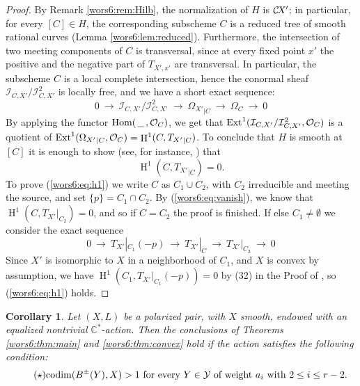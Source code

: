 \documentclass[10pt,a4paper]{article}
\numberwithin{equation}{section}
\newtheorem{corollary}[theorem]{Corollary}
\theoremstyle{definition}
\theoremstyle{remark}
\DeclareMathOperator{\HH}{H}
\def\C{{\mathbb C}}
\def\cI{{\mathcal I}}
\def\cO{{\mathcal{O}}}
\def\cY{{\mathcal Y}}
\def\operatorname#1{\mathop{\rm #1}\nolimits}
\def\Ext{\operatorname{Ext}}
\def\Hom{\operatorname{Hom}}
\def\Hom{\operatorname{Hom}}
\def\codim{\operatorname{codim}}
\def\CX{\mathcal{C}\!X\hspace{-0.5pt}}
\newcommand{\shse}[3]{0 ~\lra ~#1~ \lra ~#2~ \lra ~#3~ \lra~ 0}
\newcommand\lra{\longrightarrow}
\begin{document}
\begin{proof}
By Remark \ref{wors6:rem:Hilb}, the normalization of $H$ is $\CX'$; in particular, for every $[C]\in H$, the corresponding subscheme $C$ is a reduced tree of smooth rational curves (Lemma \ref{wors6:lem:reduced}). Furthermore, the intersection of two meeting components of $C$ is transversal, since at every fixed point $x'$ the positive and the negative part of $T_{X',x'}$ are transversal. In particular, the subscheme $C$ is a local complete intersection, hence the conormal sheaf $\cI_{C,X'}/\cI^2_{C,X'}$ is locally free, and we have a short exact sequence:
$$
\shse{\cI_{C,X'}/\cI^2_{C,X'}}{{\Omega_{X'}}_{|C}}{\Omega_C}
$$
By applying the functor $\Hom(\,\underline{\ \ }\,,\cO_C)$, we get that $\Ext^1(\cI_{C,X'}/\cI^2_{C,X'},\cO_C)$ is a quotient of $\Ext^1({\Omega_{X'}}_{|C},\cO_C)=\HH^1(C,{T_{X'}}_{|C})$. To conclude that $H$  is smooth at $[C]$ it is enough to show (see, for instance, \cite[Theorem~I.2.8]{wors6-kollar}) that \begin{equation}\label{wors6:eq:h1}
\HH^1(C,{T_{X'}}_{|C})=0.
\end{equation}
To prove (\ref{wors6:eq:h1}) we  write $C$ as $C_1 \cup C_2$, with $C_2$ irreducible and meeting the source, and set $\{p\}=C_1\cap C_2$. By (\ref{wors6:eq:vanish}), we know that $\HH^1(C,T_{X'}|_{C_2})=0$,  and so if $C=C_2$ the proof is finished. If else $C_1 \not = \emptyset$ we consider the exact sequence
\[\shse{T_{X'}|_{C_1}(-p)}{T_{X'}|_C}{T_{X'}|_{C_2}}\]
Since $X'$ is isomorphic to $X$ in a neighborhood of $C_1$, and $X$ is convex by assumption, we  have $\HH^1(C_1,T_{X'}|_{C_1}(-p))=0$ by (32) in the Proof of \cite[Lemma~10]{wors6-FP}, so  (\ref{wors6:eq:h1}) holds.
\end{proof}

\setcounter{section}{7}\setcounter{theorem}{0}

\begin{corollary}\label{wors6:cor:main}
Let $(X,L)$ be a polarized pair, with $X$ smooth, endowed with an equalized nontrivial $\C^*$-action. Then the conclusions of Theorems \ref{wors6:thm:main} and \ref{wors6:thm:convex} hold if the action satisfies the following condition:
\begin{equation}\label{wors6:eq:condition}\tag{$\star$} 
\text{$\codim(B^\pm(Y),X)>1$ for every $Y\in \cY$ of weight $a_i$ with $2 \le i \le r-2$.}
\end{equation}
\end{corollary}
\end{document}
